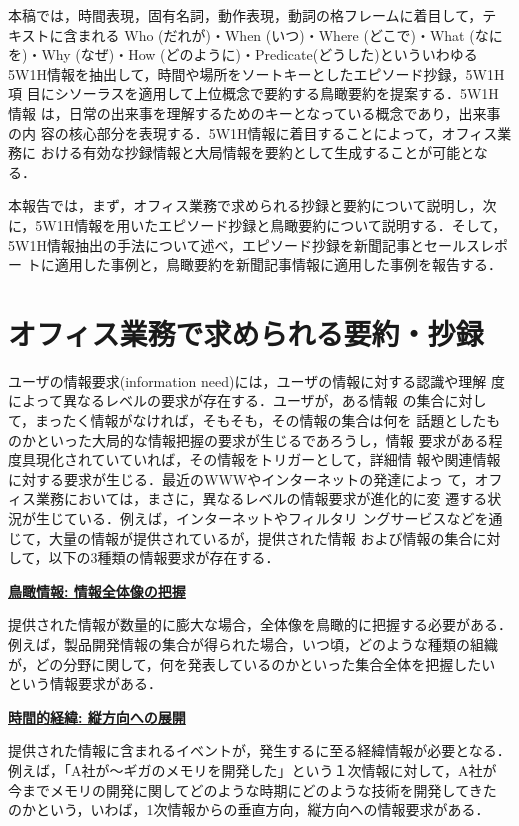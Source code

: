 本稿では，時間表現，固有名詞，動作表現，動詞の格フレームに着目して，テ
キストに含まれる Who (だれが)・When (いつ)・Where (どこで)・What (なに
を)・Why (なぜ)・How (どのように)・Predicate(どうした)といういわゆる
5W1H情報を抽出して，時間や場所をソートキーとしたエピソード抄録，5W1H項
目にシソーラスを適用して上位概念で要約する鳥瞰要約を提案する．5W1H情報
は，日常の出来事を理解するためのキーとなっている概念であり，出来事の内
容の核心部分を表現する．5W1H情報に着目することによって，オフィス業務に
おける有効な抄録情報と大局情報を要約として生成することが可能となる．

本報告では，まず，オフィス業務で求められる抄録と要約について説明し，次
に，5W1H情報を用いたエピソード抄録と鳥瞰要約について説明する．そして，
5W1H情報抽出の手法について述べ，エピソード抄録を新聞記事とセールスレポー
トに適用した事例と，鳥瞰要約を新聞記事情報に適用した事例を報告する．

\section{オフィス業務で求められる要約・抄録}

ユーザの情報要求(information need)には，ユーザの情報に対する認識や理解
度によって異なるレベルの要求が存在する\cite{taylor}．ユーザが，ある情報
の集合に対して，まったく情報がなければ，そもそも，その情報の集合は何を
話題としたものかといった大局的な情報把握の要求が生じるであろうし，情報
要求がある程度具現化されていていれば，その情報をトリガーとして，詳細情
報や関連情報に対する要求が生じる．最近のWWWやインターネットの発達によっ
て，オフィス業務においては，まさに，異なるレベルの情報要求が進化的に変
遷する状況が生じている\cite{bates}．例えば，インターネットやフィルタリ
ングサービスなどを通じて，大量の情報が提供されているが，提供された情報
および情報の集合に対して，以下の3種類の情報要求が存在する．

\noindent\underline{\bf 鳥瞰情報:  情報全体像の把握}

提供された情報が数量的に膨大な場合，全体像を鳥瞰的に把握する必要がある．
例えば，製品開発情報の集合が得られた場合，いつ頃，どのような種類の組織
が，どの分野に関して，何を発表しているのかといった集合全体を把握したい
という情報要求がある．

\noindent\underline{\bf 時間的経緯: 縦方向への展開} 

提供された情報に含まれるイベントが，発生するに至る経緯情報が必要となる．
例えば，「A社が〜ギガのメモリを開発した」という１次情報に対して，A社が
今までメモリの開発に関してどのような時期にどのような技術を開発してきた
のかという，いわば，1次情報からの垂直方向，縦方向への情報要求がある．


